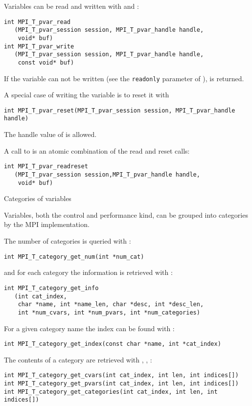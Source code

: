 Variables can be read and written with
 and :
\begin{lstlisting}
int MPI_T_pvar_read
   (MPI_T_pvar_session session, MPI_T_pvar_handle handle,
    void* buf)
int MPI_T_pvar_write
   (MPI_T_pvar_session session, MPI_T_pvar_handle handle,
    const void* buf)
\end{lstlisting}
If the variable can not be written
(see the \lstinline{readonly} parameter of ),
  is returned.

A special case of writing the variable is to reset it with
\begin{lstlisting}
int MPI_T_pvar_reset(MPI_T_pvar_session session, MPI_T_pvar_handle handle)  
\end{lstlisting}
The handle value of  is allowed.

A call to 
is an atomic combination of the read and reset calls:
\begin{lstlisting}
int MPI_T_pvar_readreset
   (MPI_T_pvar_session session,MPI_T_pvar_handle handle, 
    void* buf)
\end{lstlisting}


 {Categories of variables}

Variables, both the control and performance kind,
can be grouped into categories by the MPI implementation.

The number of categories is queried with
:
\begin{lstlisting}
int MPI_T_category_get_num(int *num_cat)
\end{lstlisting}
and for each category the information is retrieved with
:
\begin{lstlisting}
int MPI_T_category_get_info
   (int cat_index,
    char *name, int *name_len, char *desc, int *desc_len, 
    int *num_cvars, int *num_pvars, int *num_categories)
\end{lstlisting}
For a given category name the index can be found with
:
\begin{lstlisting}
int MPI_T_category_get_index(const char *name, int *cat_index)
\end{lstlisting}

The contents of a category are retrieved with
,
,
:
\begin{lstlisting}
int MPI_T_category_get_cvars(int cat_index, int len, int indices[])
int MPI_T_category_get_pvars(int cat_index, int len, int indices[])
int MPI_T_category_get_categories(int cat_index, int len, int indices[])
\end{lstlisting}

